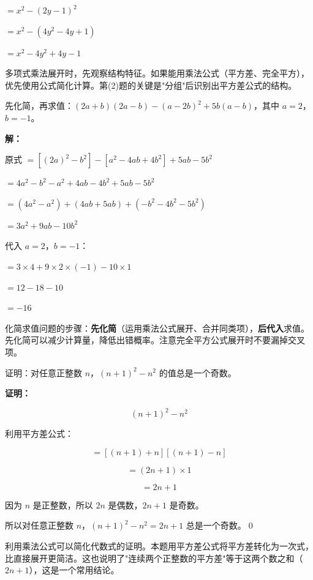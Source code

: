 \documentclass[12pt, a4paper]{ctexart}
\begin{document}
$= x^2 - (2y - 1)^2$

$= x^2 - (4y^2 - 4y + 1)$

$= x^2 - 4y^2 + 4y - 1$

\begin{tipbox}[方法总结]
多项式乘法展开时，先观察结构特征。如果能用乘法公式（平方差、完全平方），优先使用公式简化计算。第(2)题的关键是"分组"后识别出平方差公式的结构。
\end{tipbox}

\begin{examplebox}
先化简，再求值：$(2a + b)(2a - b) - (a - 2b)^2 + 5b(a - b)$，其中 $a = 2$，$b = -1$。
\end{examplebox}

\textbf{解：}

原式 $= [(2a)^2 - b^2] - [a^2 - 4ab + 4b^2] + 5ab - 5b^2$

$= 4a^2 - b^2 - a^2 + 4ab - 4b^2 + 5ab - 5b^2$

$= (4a^2 - a^2) + (4ab + 5ab) + (-b^2 - 4b^2 - 5b^2)$

$= 3a^2 + 9ab - 10b^2$

代入 $a = 2$，$b = -1$：

$= 3 \times 4 + 9 \times 2 \times (-1) - 10 \times 1$

$= 12 - 18 - 10$

$= -16$

\begin{tipbox}[方法总结]
化简求值问题的步骤：\textbf{先化简}（运用乘法公式展开、合并同类项），\textbf{后代入}求值。先化简可以减少计算量，降低出错概率。注意完全平方公式展开时不要漏掉交叉项。
\end{tipbox}

\begin{examplebox}
证明：对任意正整数 $n$，$(n+1)^2 - n^2$ 的值总是一个奇数。
\end{examplebox}

\textbf{证明：}

$$(n+1)^2 - n^2$$

利用平方差公式：

$$= [(n+1) + n][(n+1) - n]$$

$$= (2n + 1) \times 1$$

$$= 2n + 1$$

因为 $n$ 是正整数，所以 $2n$ 是偶数，$2n + 1$ 是奇数。

所以对任意正整数 $n$，$(n+1)^2 - n^2 = 2n + 1$ 总是一个奇数。\qed

\begin{tipbox}[方法总结]
利用乘法公式可以简化代数式的证明。本题用平方差公式将平方差转化为一次式，比直接展开更简洁。这也说明了"连续两个正整数的平方差"等于这两个数之和（$2n+1$），这是一个常用结论。
\end{tipbox}
\end{document}
